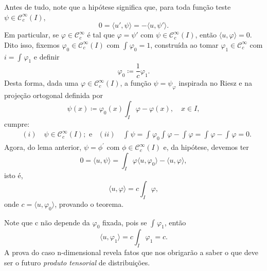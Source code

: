 \documentclass[../distribution_theory_notes.tex]{subfiles}
\begin{document}
\begin{proof*}
  Antes de tudo, note que a hipótese significa que, para toda função teste \(\psi \in \mathcal{C}_{c}^{\infty}(I)\), 
    \[
      0=\langle u', \psi  \rangle = - \langle u, \psi ' \rangle.
    \]
    Em particular, se \(\varphi \in \mathcal{C}_{c}^{\infty}\) é tal que \(\varphi = \psi '\) com \(\psi \in \mathcal{C}_{c}^{\infty}(I)\), então \(\langle u, \varphi  \rangle=0\). Dito isso, fixemos \(\varphi_{0}\in \mathcal{C}_{c}^{\infty}(I)\) com \(\int_{}^{}\varphi_{0}=1\), construída ao tomar \(\varphi_1\in \mathcal{C}_{c}^{\infty}\) com \(i=\int_{}^{}\varphi_1\) e definir 
      \[
        \varphi_{0}\coloneqq \frac{1}{c}\varphi_1.
      \]
     Desta forma, dada uma \(\varphi \in \mathcal{C}_{c}^{\infty}(I)\), a função \(\psi =\psi_{\varphi }\) inspirada no Riesz e na projeção ortogonal definida por 
       \[
         \psi (x)\coloneqq \varphi_{0}(x) \int_{I}^{}\varphi - \varphi (x),\quad x\in I,
       \]
       cumpre: 
      \begin{align*}
          &(i)\quad \psi \in \mathcal{C}_{c}^{\infty}(I); \text{ e} 
          &(ii)\quad \int_{}^{}\psi = \int_{}^{}\varphi_{0} \int_{}^{}\varphi - \int_{}^{}\varphi = \int_{}^{}\varphi - \int_{}^{}\varphi =0.
      \end{align*}
  Agora, do lema anterior, \(\psi =\phi^{'}\) com \(\phi\in \mathcal{C}_{c}^{\infty}(I)\) e, da hipótese, devemos ter 
    \[
      0=\langle u, \psi  \rangle = \int_{I}^{}\varphi \langle u, \varphi_{0} \rangle - \langle u, \varphi  \rangle,
    \]
    isto é, 
      \[
        \langle u, \varphi  \rangle = c \int_{I}^{}\varphi,
      \]
      onde \(c = \langle u, \varphi_{0} \rangle\), provando o teorema. \qedsymbol
\end{proof*}
  \begin{tcolorbox}[
  skin=enhanced,
  title=Observação,
  fonttitle=\bfseries,
colframe=black,
  colbacktitle=cyan!75!white, 
  colback=cyan!15,
  colbacklower=black,
coltitle=black,
  drop fuzzy shadow,
  ]
  Note que c não depende da \(\varphi_{0}\) fixada, pois se \(\int_{}^{}\varphi_1\), então 
    \[
      \langle u, \varphi_1 \rangle = c \int_{I}^{}\varphi_1 = c. 
    \]
    A prova do caso n-dimensional revela fatos que nos obrigarão a saber o que deve ser o futuro \textit{produto tensorial} de distribuições.
  \end{tcolorbox}
\end{document}
